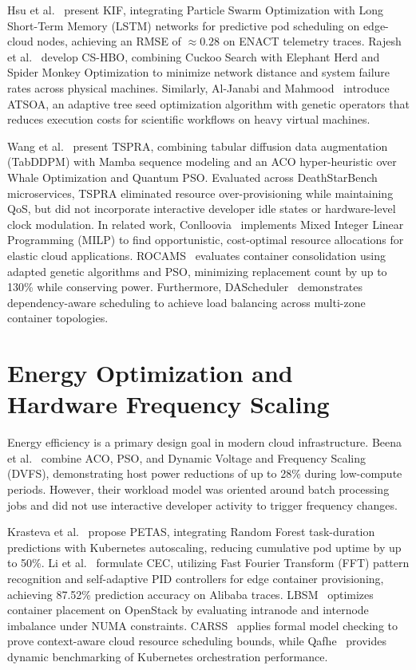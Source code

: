 \documentclass[12pt,a4paper]{report}
\begin{document}
Hsu et al.~\cite{pso_lstm} present KIF, integrating Particle Swarm Optimization with Long Short-Term Memory (LSTM) networks for predictive pod scheduling on edge-cloud nodes, achieving an RMSE of $\approx 0.28$ on ENACT telemetry traces. Rajesh et al.~\cite{cshbo} develop CS-HBO, combining Cuckoo Search with Elephant Herd and Spider Monkey Optimization to minimize network distance and system failure rates across physical machines. Similarly, Al-Janabi and Mahmood~\cite{atsoa} introduce ATSOA, an adaptive tree seed optimization algorithm with genetic operators that reduces execution costs for scientific workflows on heavy virtual machines.

Wang et al.~\cite{tspra} present TSPRA, combining tabular diffusion data augmentation (TabDDPM) with Mamba sequence modeling and an ACO hyper-heuristic over Whale Optimization and Quantum PSO. Evaluated across DeathStarBench microservices, TSPRA eliminated resource over-provisioning while maintaining QoS, but did not incorporate interactive developer idle states or hardware-level clock modulation. In related work, Conlloovia~\cite{conlloovia} implements Mixed Integer Linear Programming (MILP) to find opportunistic, cost-optimal resource allocations for elastic cloud applications. ROCAMS~\cite{rocams} evaluates container consolidation using adapted genetic algorithms and PSO, minimizing replacement count by up to 130\% while conserving power. Furthermore, DAScheduler~\cite{dascheduler} demonstrates dependency-aware scheduling to achieve load balancing across multi-zone container topologies.

\section{Energy Optimization and Hardware Frequency Scaling}
Energy efficiency is a primary design goal in modern cloud infrastructure. Beena et al.~\cite{dvfs} combine ACO, PSO, and Dynamic Voltage and Frequency Scaling (DVFS), demonstrating host power reductions of up to 28\% during low-compute periods. However, their workload model was oriented around batch processing jobs and did not use interactive developer activity to trigger frequency changes.

Krasteva et al.~\cite{petas} propose PETAS, integrating Random Forest task-duration predictions with Kubernetes autoscaling, reducing cumulative pod uptime by up to 50\%. Li et al.~\cite{cec} formulate CEC, utilizing Fast Fourier Transform (FFT) pattern recognition and self-adaptive PID controllers for edge container provisioning, achieving 87.52\% prediction accuracy on Alibaba traces. LBSM~\cite{lbsm} optimizes container placement on OpenStack by evaluating intranode and internode imbalance under NUMA constraints. CARSS~\cite{carss} applies formal model checking to prove context-aware cloud resource scheduling bounds, while Qafhe~\cite{qafhe} provides dynamic benchmarking of Kubernetes orchestration performance.
\end{document}
